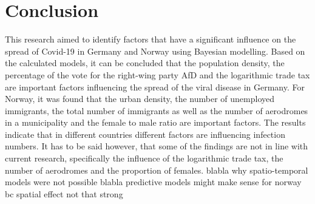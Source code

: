 %
\chapter{Conclusion}
This research aimed to identify factors that have a significant influence on the spread of Covid-19 in Germany and Norway using Bayesian modelling. Based on the calculated models, it can be concluded that the population density, the percentage of the vote for the right-wing party AfD and the logarithmic trade tax are important factors influencing the spread of the viral disease in Germany. For Norway, it was found that the urban density, the number of unemployed immigrants, the total number of immigrants as well as the number of aerodromes in a municipality and the female to male ratio are important factors. The results indicate that in different countries different factors are influencing infection numbers. It has to be said however, that some of the findings are not in line with current research, specifically the influence of the logarithmic trade tax, the number of aerodromes and the proportion of females. 
blabla why spatio-temporal models were not possible blabla predictive models might make sense for norway bc spatial effect not that strong